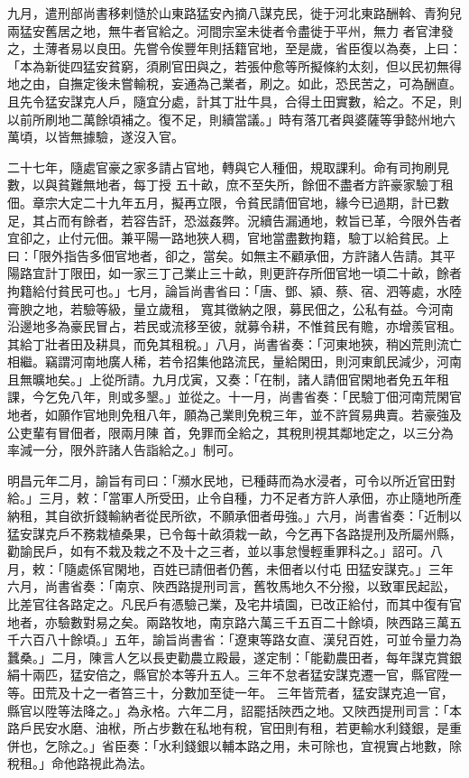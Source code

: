 \begin{pinyinscope}
 九月，遣刑部尚書移剌慥於山東路猛安內摘八謀克民，徙于河北東路酬斡、青狗兒兩猛安舊居之地，無牛者官給之。河間宗室未徙者令盡徙于平州，無力
 者官津發之，土薄者易以良田。先嘗令俟豐年則括籍官地，至是歲，省臣復以為奏，上曰：「本為新徙四猛安貧窮，須刷官田與之，若張仲愈等所擬條約太刻，但以民初無得地之由，自撫定後未嘗輸稅，妄通為己業者，刷之。如此，恐民苦之，可為酬直。且先令猛安謀克人戶，隨宜分處，計其丁壯牛具，合得土田實數，給之。不足，則以前所刷地二萬餘頃補之。復不足，則續當議。」時有落兀者與婆薩等爭懿州地六萬頃，以皆無據驗，遂沒入官。



 二十七年，隨處官豪之家多請占官地，轉與它人種佃，規取課利。命有司拘刷見數，以與貧難無地者，每丁授
 五十畝，庶不至失所，餘佃不盡者方許豪家驗丁租佃。章宗大定二十九年五月，擬再立限，令貧民請佃官地，緣今已過期，計已數足，其占而有餘者，若容告訐，恐滋姦弊。況續告漏通地，敕旨已革，今限外告者宜卻之，止付元佃。兼平陽一路地狹人稠，官地當盡數拘籍，驗丁以給貧民。上曰：「限外指告多佃官地者，卻之，當矣。如無主不顧承佃，方許諸人告請。其平陽路宜計丁限田，如一家三丁己業止三十畝，則更許存所佃官地一頃二十畝，餘者拘籍給付貧民可也。」七月，論旨尚書省曰：「唐、鄧、潁、蔡、宿、泗等處，水陸膏腴之地，若驗等級，量立歲租，
 寬其徵納之限，募民佃之，公私有益。今河南沿邊地多為豪民冒占，若民或流移至彼，就募令耕，不惟貧民有贍，亦增羨官租。其給丁壯者田及耕具，而免其租稅。」八月，尚書省奏：「河東地狹，稍凶荒則流亡相繼。竊謂河南地廣人稀，若令招集他路流民，量給閑田，則河東飢民減少，河南且無曠地矣。」上從所請。九月戊寅，又奏：「在制，諸人請佃官閑地者免五年租課，今乞免八年，則或多墾。」並從之。十一月，尚書省奏：「民驗丁佃河南荒閑官地者，如願作官地則免租八年，願為己業則免稅三年，並不許貿易典賣。若豪強及公吏輩有冒佃者，限兩月陳
 首，免罪而全給之，其稅則視其鄰地定之，以三分為率減一分，限外許諸人告詣給之。」制可。



 明昌元年二月，諭旨有司曰：「瀕水民地，已種蒔而為水浸者，可令以所近官田對給。」三月，敕：「當軍人所受田，止令自種，力不足者方許人承佃，亦止隨地所產納租，其自欲折錢輸納者從民所欲，不願承佃者毋強。」六月，尚書省奏：「近制以猛安謀克戶不務栽植桑果，已令每十畝須栽一畝，今乞再下各路提刑及所屬州縣，勸諭民戶，如有不栽及栽之不及十之三者，並以事怠慢輕重罪科之。」詔可。八月，敕：「隨處係官閑地，百姓已請佃者仍舊，未佃者以付屯
 田猛安謀克。」三年六月，尚書省奏：「南京、陜西路提刑司言，舊牧馬地久不分撥，以致軍民起訟，比差官往各路定之。凡民戶有憑驗己業，及宅井墳園，已改正給付，而其中復有官地者，亦驗數對易之矣。兩路牧地，南京路六萬三千五百二十餘頃，陜西路三萬五千六百八十餘頃。」五年，諭旨尚書省：「遼東等路女直、漢兒百姓，可並令量力為蠶桑。」二月，陳言人乞以長吏勸農立殿最，遂定制：「能勸農田者，每年謀克賞銀絹十兩匹，猛安倍之，縣官於本等升五人。三年不怠者猛安謀克遷一官，縣官陞一等。田荒及十之一者笞三十，分數加至徒一年。
 三年皆荒者，猛安謀克追一官，縣官以陞等法降之。」為永格。六年二月，詔罷括陜西之地。又陜西提刑司言：「本路戶民安水磨、油栿，所占步數在私地有稅，官田則有租，若更輸水利錢銀，是重併也，乞除之。」省臣奏：「水利錢銀以輔本路之用，未可除也，宜視實占地數，除稅租。」命他路視此為法。




\end{pinyinscope}

